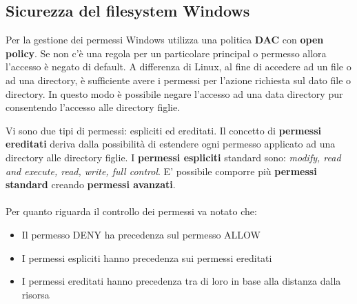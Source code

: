 \subsection{Sicurezza del filesystem Windows}
Per la gestione dei permessi Windows utilizza una politica \textbf{DAC} con \textbf{open policy}. Se non c'è una regola per un particolare principal o permesso allora l'accesso è negato di default. A differenza di Linux, al fine di accedere ad un file o ad una directory, è sufficiente avere i permessi per l'azione richiesta sul dato file o directory. In questo modo è possibile negare l'accesso ad una data directory pur consentendo l'accesso alle directory figlie.\newline 

Vi sono due tipi di permessi: espliciti ed ereditati. Il concetto di \textbf{permessi ereditati} deriva dalla possibilità di estendere ogni permesso applicato ad una directory alle directory figlie. I \textbf{permessi espliciti} standard sono: \emph{modify, read and execute, read, write, full control}. E' possibile comporre più \textbf{permessi standard} creando \textbf{permessi avanzati}. \\ \\
Per quanto riguarda il controllo dei permessi va notato che:
\begin{itemize}
  \item Il permesso DENY ha precedenza sul permesso ALLOW
  \item I permessi espliciti hanno precedenza sui permessi ereditati
  \item I permessi ereditati hanno precedenza tra di loro in base alla distanza dalla risorsa
\end{itemize}
  
